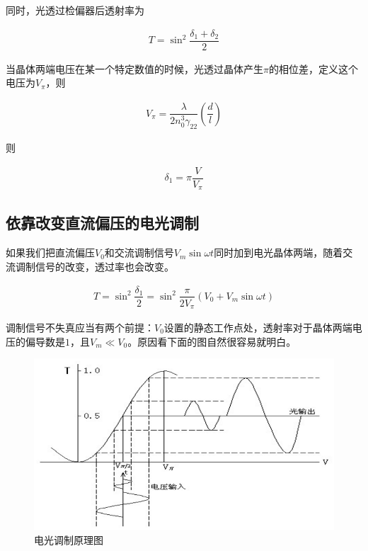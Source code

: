\documentclass{article}
\begin{document}
同时，光透过检偏器后透射率为

\begin{equation*}
  \begin{aligned}
    T = \sin^2 \dfrac{\delta_1 + \delta_2}{2} 
  \end{aligned}
\end{equation*}

当晶体两端电压在某一个特定数值的时候，光透过晶体产生$\pi$的相位差，定义这个电压为$V_{\pi}$，则

\begin{equation*}
  \begin{aligned}
    V_{\pi} = \dfrac{\lambda}{2 n_0^3 \gamma_{22}} \left( \dfrac{d}{l}  \right)  
  \end{aligned}
\end{equation*}

则

\begin{equation*}
  \begin{aligned}
    \delta_1 = \pi \dfrac{V}{V_{\pi}} 
  \end{aligned}
\end{equation*}

\subsection{依靠改变直流偏压的电光调制}

如果我们把直流偏压$V_0$和交流调制信号$V_m \sin \omega t$同时加到电光晶体两端，随着交流调制信号的改变，透过率也会改变。

\begin{equation*}
  \begin{aligned}
    T = \sin^2 \dfrac{\delta_1}{2} = \sin^2 \dfrac{\pi}{2 V_{\pi}} \left( V_0 + V_m \sin \omega t \right)  
  \end{aligned}
\end{equation*}

调制信号不失真应当有两个前提：$V_0$设置的静态工作点处，透射率对于晶体两端电压的偏导数是$1$，且$V_m \ll V_0$。原因看下面的图自然很容易就明白。

\begin{figure}[H]
  \centering
  \includegraphics[width=0.7\linewidth]{figures/电光调制原理}
  \caption{电光调制原理图}
\end{figure}
\end{document}
